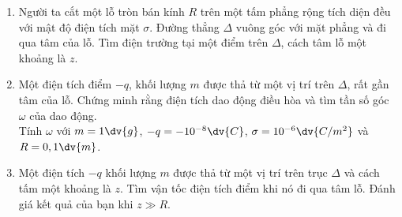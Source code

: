     
    \begin{vd}
    \begin{enumerate}[1)]
    \setlength{\itemsep}{0pt}
        \item Người ta cắt một lỗ tròn bán kính $R$ trên một tấm phẳng rộng tích diện đều với mật độ điện tích mặt $\sigma$. Đường thẳng $\Delta$ vuông góc với mặt phẳng và đi qua tâm của lỗ. Tìm điện trường tại một điểm trên $\Delta$, cách tâm lỗ một khoảng là $z$.
        \item Một điện tích điểm $-q$, khối lượng $m$ được thả từ một vị trí trên $\Delta$, rất gần tâm của lỗ. Chứng minh rằng điện tích dao động điều hòa và tìm tần số góc $\omega$ của dao động.\\
        Tính $\omega$ với $m=1\dv{g}$, $-q=-10^{-8}\dv{C}$, $\sigma=10^{-6}\dv{C/m^2}$ và $R=0,1\dv{m}$.
        \item Một điện tích $-q$ khối lượng $m$ được thả từ một vị trí trên trục $\Delta$ và cách tấm một khoảng là $z$. Tìm vận tốc điện tích điểm khi nó đi qua tâm lỗ. Đánh giá kết quả của bạn khi $z\gg R$.
    \end{enumerate}
    \end{vd}
